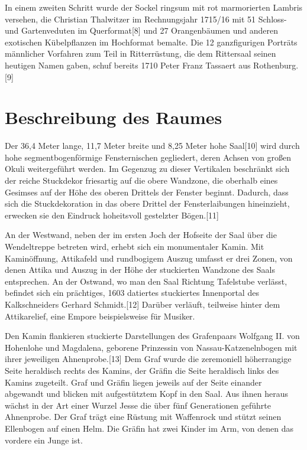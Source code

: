 \documentclass[
  letterpaper,
]{book}
\begin{document}
In einem zweiten Schritt wurde der Sockel ringsum mit rot marmorierten
Lambris versehen, die Christian Thalwitzer im Rechnungsjahr 1715/16 mit
51 Schloss- und Gartenveduten im Querformat{[}8{]} und 27 Orangenbäumen
und anderen exotischen Kübelpflanzen im Hochformat bemalte. Die 12
ganzfigurigen Porträts männlicher Vorfahren zum Teil in Ritterrüstung,
die dem Rittersaal seinen heutigen Namen gaben, schuf bereits 1710 Peter
Franz Tassaert aus Rothenburg.{[}9{]}

\section{\texorpdfstring{\textbf{Beschreibung des
Raumes}}{Beschreibung des Raumes}}\label{beschreibung-des-raumes}

Der 36,4 Meter lange, 11,7 Meter breite und 8,25 Meter hohe Saal{[}10{]}
wird durch hohe segmentbogenförmige Fensternischen gegliedert, deren
Achsen von großen Okuli weitergeführt werden. Im Gegenzug zu dieser
Vertikalen beschränkt sich der reiche Stuckdekor friesartig auf die
obere Wandzone, die oberhalb eines Gesimses auf der Höhe des oberen
Drittels der Fenster beginnt. Dadurch, dass sich die Stuckdekoration in
das obere Drittel der Fensterlaibungen hineinzieht, erwecken sie den
Eindruck hoheitsvoll gestelzter Bögen.{[}11{]}

An der Westwand, neben der im ersten Joch der Hofseite der Saal über die
Wendeltreppe betreten wird, erhebt sich ein monumentaler Kamin. Mit
Kaminöffnung, Attikafeld und rundbogigem Auszug umfasst er drei Zonen,
von denen Attika und Auszug in der Höhe der stuckierten Wandzone des
Saals entsprechen. An der Ostwand, wo man den Saal Richtung Tafelstube
verlässt, befindet sich ein prächtiges, 1603 datiertes stuckiertes
Innenportal des Kalkschneiders Gerhard Schmidt.{[}12{]} Darüber
verläuft, teilweise hinter dem Attikarelief, eine Empore beispielsweise
für Musiker.

Den Kamin flankieren stuckierte Darstellungen des Grafenpaars Wolfgang
II. von Hohenlohe und Magdalena, geborene Prinzessin von
Nassau-Katzenelnbogen mit ihrer jeweiligen Ahnenprobe.{[}13{]} Dem Graf
wurde die zeremoniell höherrangige Seite heraldisch rechts des Kamins,
der Gräfin die Seite heraldisch links des Kamins zugeteilt. Graf und
Gräfin liegen jeweils auf der Seite einander abgewandt und blicken mit
aufgestütztem Kopf in den Saal. Aus ihnen heraus wächst in der Art einer
Wurzel Jesse die über fünf Generationen geführte Ahnenprobe. Der Graf
trägt eine Rüstung mit Waffenrock und stützt seinen Ellenbogen auf einen
Helm. Die Gräfin hat zwei Kinder im Arm, von denen das vordere ein Junge
ist.
\end{document}
